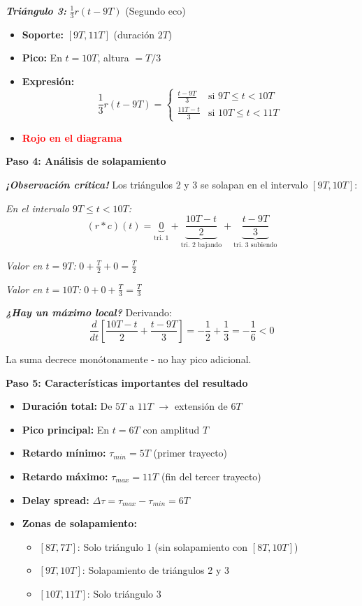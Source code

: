 \documentclass[11pt,a4paper]{article}
\begin{document}
\textit{\textbf{Tri\'angulo 3:}} $\frac{1}{3}r(t-9T)$ (Segundo eco)
\begin{itemize}
    \item \textbf{Soporte:} $[9T, 11T]$ (duraci\'on $2T$)
    \item \textbf{Pico:} En $t = 10T$, altura $= T/3$
    \item \textbf{Expresi\'on:}
    \[
    \frac{1}{3}r(t-9T) = \begin{cases}
    \frac{t - 9T}{3} & \text{si } 9T \leq t < 10T \\
    \frac{11T - t}{3} & \text{si } 10T \leq t < 11T
    \end{cases}
    \]
    \item \textcolor{red}{\textbf{Rojo en el diagrama}}
\end{itemize}

\textbf{Paso 4: An\'alisis de solapamiento}

\textit{\textbf{¡Observaci\'on cr\'itica!}} Los tri\'angulos 2 y 3 se solapan en el intervalo $[9T, 10T]$:

\textit{En el intervalo $9T \leq t < 10T$:}
\[
(r*c)(t) = \underbrace{0}_{\text{tri. 1}} + \underbrace{\frac{10T-t}{2}}_{\text{tri. 2 bajando}} + \underbrace{\frac{t-9T}{3}}_{\text{tri. 3 subiendo}}
\]

\textit{Valor en $t = 9T$:} $0 + \frac{T}{2} + 0 = \frac{T}{2}$

\textit{Valor en $t = 10T$:} $0 + 0 + \frac{T}{3} = \frac{T}{3}$

\textit{\textbf{¿Hay un m\'aximo local?}} Derivando:
\[
\frac{d}{dt}\left[\frac{10T-t}{2} + \frac{t-9T}{3}\right] = -\frac{1}{2} + \frac{1}{3} = -\frac{1}{6} < 0
\]

La suma decrece mon\'otonamente - no hay pico adicional.

\textbf{Paso 5: Caracter\'isticas importantes del resultado}

\begin{itemize}
    \item \textbf{Duraci\'on total:} De $5T$ a $11T$ $\to$ extensi\'on de $6T$
    \item \textbf{Pico principal:} En $t = 6T$ con amplitud $T$
    \item \textbf{Retardo m\'inimo:} $\tau_{min} = 5T$ (primer trayecto)
    \item \textbf{Retardo m\'aximo:} $\tau_{max} = 11T$ (fin del tercer trayecto)
    \item \textbf{Delay spread:} $\Delta\tau = \tau_{max} - \tau_{min} = 6T$
    \item \textbf{Zonas de solapamiento:}
    \begin{itemize}
        \item $[8T, 7T]$: Solo tri\'angulo 1 (sin solapamiento con $[8T, 10T]$)
        \item $[9T, 10T]$: Solapamiento de tri\'angulos 2 y 3
        \item $[10T, 11T]$: Solo tri\'angulo 3
    \end{itemize}
\end{itemize}
\end{document}
